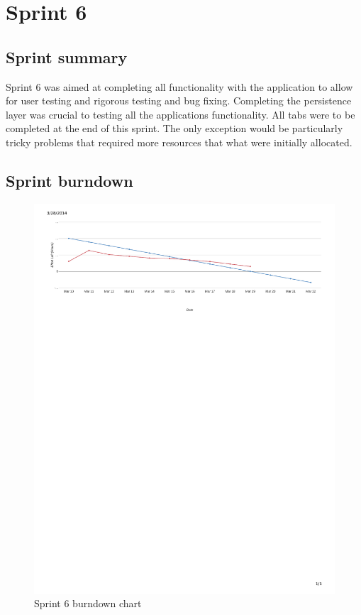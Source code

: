\section{Sprint 6}
\subsection{Sprint summary}
Sprint 6 was aimed at completing all functionality with the application to allow for user testing and rigorous testing and bug fixing. Completing the persistence layer was crucial to testing all the applications functionality. All tabs were to be completed at the end of this sprint. The only exception would be particularly tricky problems that required more resources that what were initially allocated.

\subsection{Sprint burndown}



\begin{figure}[H]
\includegraphics[width=\textwidth, trim= 1cm 21cm 1cm 1cm, clip=true]{ch/projectManagement/fig/burndown4.pdf}
\caption{Sprint 6 burndown chart}
\label{fig:sprint6burndown}
\end{figure}

